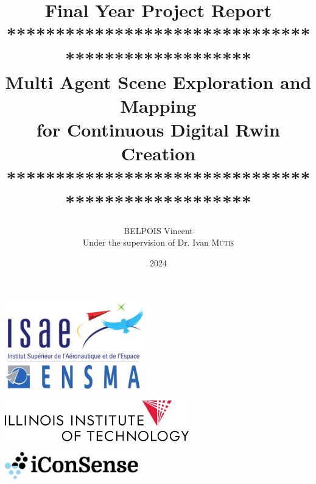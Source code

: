 \documentclass[11pt]{article}
\title{Final Year Project Report\vspace{10pt}\\
**************************************************\\
Multi Agent Scene Exploration and Mapping \\
for Continuous Digital Rwin Creation\vspace{10pt}\\
**************************************************}
\author{BELPOIS Vincent \\ Under the supervision of Dr. Ivan \textsc{Mutis}}
\begin{document}
\date{2024}
\maketitle
\thispagestyle{empty}

\vspace{10mm}

    \begin{center}
    \includegraphics[width = 6cm]{Images/logo_ensma.png}
    \end{center}
    \vspace{2cm}
    \begin{center}
        \includegraphics[width = 8cm]{Images/IIT_Logo_stack_186_blk.png}
    \end{center}
    \vspace{1cm}
    \begin{center}
        \includegraphics[width = 6cm]{Images/logo_iconsense_bloack_text.png}
    \end{center}
    \newpage
    \thispagestyle{empty}
    \mbox{}
    
    

    
\end{document}
